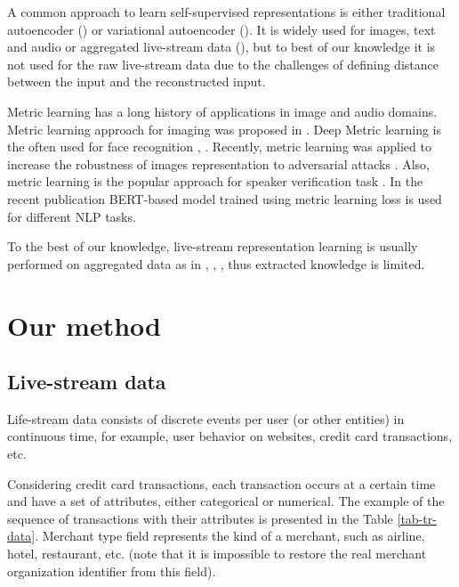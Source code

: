 \documentclass[sigconf]{acmart}
\begin{document}
A common approach to learn self-supervised representations is either traditional autoencoder (\cite{rumelhart1985learning}) or variational autoencoder (\cite{kingma2013auto}). It is widely used for images, text and audio or aggregated live-stream data (\cite{mancisidor2019learning}), but to best of our knowledge it is not used for the raw live-stream data due to the challenges of defining distance between the input and the reconstructed input.

Metric learning has a long history of applications in image and audio domains. Metric learning approach for imaging was proposed in \cite{Hadsell:2006:DRL:1153171.1153654}. 
Deep Metric learning is the often used for face recognition \cite{Schroff2015FaceNetAU}, \cite{kaya2019deep}. Recently, metric learning was applied to increase the robustness of images representation to adversarial attacks \cite{Mao2019AdvRobust}. Also, metric learning is the popular approach for speaker verification task \cite{wan2017generalized}.
In the recent publication \cite{reimers-2019-sentence-bert} BERT-based model \cite{Devlin2019BERTPO} trained using metric learning loss is used for different NLP tasks.

To the best of our knowledge, live-stream representation learning is usually performed on aggregated data as in \cite{baldassini2018client2vec}, \cite{mancisidor2019learning}, \cite{doan2019generating}, thus extracted knowledge is limited.  

\section{Our method} \label{sec-method}

\subsection{Live-stream data}

Life-stream data consists of discrete events per user (or other entities) in continuous time, for example, user behavior on websites, credit card transactions, etc. 

Considering credit card transactions, each transaction occurs at a certain time and have a set of attributes, either categorical or numerical. The example of 
the sequence of transactions with their attributes is presented in the Table \ref{tab-tr-data}.
Merchant type field represents the kind of a merchant, such as airline, hotel, restaurant, etc. (note that it is impossible to restore the real merchant organization identifier from this field).
\end{document}
